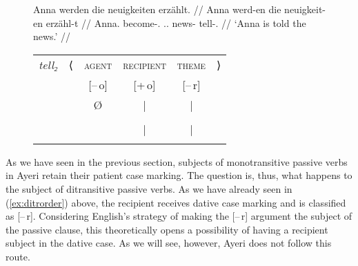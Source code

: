 \begin{figure}
\a\label{ex:gerditrpass_pass2}%
\begingl
	\gla Anna werden die neuigkeiten erzählt. //
	\glb Anna werd-en die neuigkeit-en erzähl-t //
	\glc Anna.\Dat{} become-\Tpl{}.\Prs{} \Def{}.\Nom{}.\Pl{} news-\Pl{}
		tell-\Pst{}.\Ptcp{} //
	\glft `Anna is told the news.' //
\endgl
\medskip\\
\begin{tabular}[t]{@{} >{\itshape}l l c c c r}
tell₂
	& ⟨
	& \textsc{agent}
	& \textsc{recipient}
	& \textsc{theme}
	& ⟩
	\\
%
	& %
	& [–\,o]
	& [+\,o]
	& [–\,r]
	& %
	\\

%
	& %
	& Ø
	& |
	& |
	& %
	\\

%
	& %
	& %
	& \Obj*
	& \Subj
	& %
	\\

%
	& %
	& %
	& |
	& |
	& %
	\\

%
	& %
	& %
	& \fw{Anna}
	& \fw{news}
	& %
	\\
\end{tabular}

\xe
\end{figure}

As we have seen in the previous section, subjects of monotransitive passive
verbs in Ayeri retain their patient case marking. The question is, thus, what
happens to the subject of ditransitive passive verbs. As we have already seen
in (\ref{ex:ditrorder}) above, the recipient receives dative case marking and
is classified as [–\,r]. Considering English's strategy of making the [–\,r]
argument the subject of the passive clause, this theoretically opens a
possibility of having a recipient subject in the dative case. As we will see,
however, Ayeri does not follow this route.

